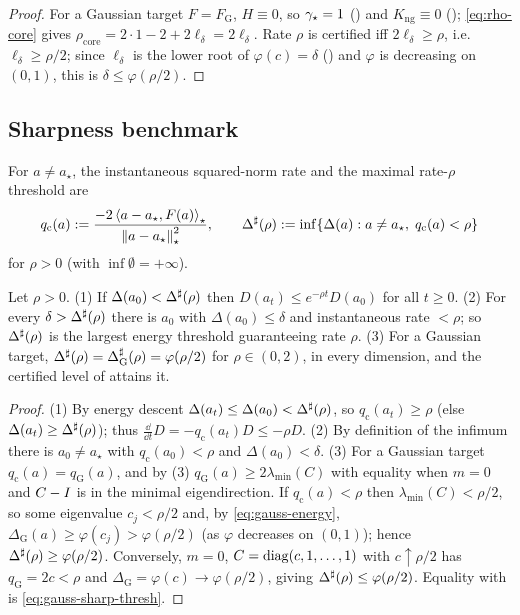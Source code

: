 \begin{proof}
For a Gaussian target $F=F_{\mathrm G}$, $H\equiv0$, so $\gamma_\star=1$ ()
and $K_{\mathrm{ng}}\equiv0$ (); \eqref{eq:rho-core} gives $\rho_{\mathrm{core}}=2\cdot1-2+2\ell_\delta=2\ell_\delta$.
Rate $\rho$ is certified iff $2\ell_\delta\geq\rho$, i.e.\ $\ell_\delta\geq\rho/2$; since
$\ell_\delta$ is the lower root of $\varphi(c)=\delta$ () and $\varphi$ is
decreasing on $(0,1)$, this is $\delta\leq\varphi(\rho/2)$.
\end{proof}

\subsection{Sharpness benchmark}

\begin{definition}
\label{def:sharp}
For $a\neq a_\star$, the instantaneous squared-norm rate and the maximal rate-$\rho$
threshold are
\[
    q_{\mathrm c}(a):=\frac{-2\left\langle a-a_\star,F(a)\right\rangle_\star}{\left\lVert a-a_\star\right\rVert_\star^2},
    \qquad
    \Delta^{\sharp}(\rho):=\inf\{\Delta(a):a\neq a_\star,\;q_{\mathrm c}(a)<\rho\}
\]
for $\rho>0$ (with $\inf\emptyset=+\infty$).
\end{definition}

\begin{proposition}
\label{prop:sharp}
Let $\rho>0$. (1) If $\Delta(a_0)<\Delta^{\sharp}(\rho)$ then $D(a_t)\leq e^{-\rho t}D(a_0)$ for all
$t\geq0$. (2) For every $\delta>\Delta^{\sharp}(\rho)$ there is $a_0$ with $\Delta(a_0)\leq\delta$
and instantaneous rate $<\rho$; so $\Delta^{\sharp}(\rho)$ is the largest energy threshold
guaranteeing rate $\rho$. (3) For a Gaussian target, $\Delta^{\sharp}(\rho)=\Delta_{\mathrm G}^\sharp(\rho)=\varphi(\rho/2)$
for $\rho\in(0,2)$, in every dimension, and the certified level of 
attains it.
\end{proposition}

\begin{proof}
(1) By energy descent $\Delta(a_t)\leq\Delta(a_0)<\Delta^{\sharp}(\rho)$, so $q_{\mathrm c}(a_t)\geq\rho$
(else $\Delta(a_t)\geq\Delta^{\sharp}(\rho)$); thus $\tfrac{\dd}{\dd t}D=-q_{\mathrm c}(a_t)D\leq-\rho D$.
(2) By definition of the infimum there is $a_0\neq a_\star$ with $q_{\mathrm c}(a_0)<\rho$ and
$\Delta(a_0)<\delta$. (3) For a Gaussian target $q_{\mathrm c}(a)=q_{\mathrm G}(a)$, and by
(3) $q_{\mathrm G}(a)\geq2\lambda_{\min}(C)$ with equality when $m=0$
and $C-I$ is in the minimal eigendirection. If $q_{\mathrm c}(a)<\rho$ then
$\lambda_{\min}(C)<\rho/2$, so some eigenvalue $c_j<\rho/2$ and, by \eqref{eq:gauss-energy},
$\Delta_{\mathrm G}(a)\geq\varphi(c_j)>\varphi(\rho/2)$ (as $\varphi$ decreases on $(0,1)$);
hence $\Delta^{\sharp}(\rho)\geq\varphi(\rho/2)$. Conversely, $m=0$,
$C=\operatorname{diag}(c,1,\dots,1)$ with $c\uparrow\rho/2$ has $q_{\mathrm G}=2c<\rho$ and
$\Delta_{\mathrm G}=\varphi(c)\to\varphi(\rho/2)$, giving $\Delta^{\sharp}(\rho)\leq\varphi(\rho/2)$.
Equality with  is \eqref{eq:gauss-sharp-thresh}.
\end{proof}

